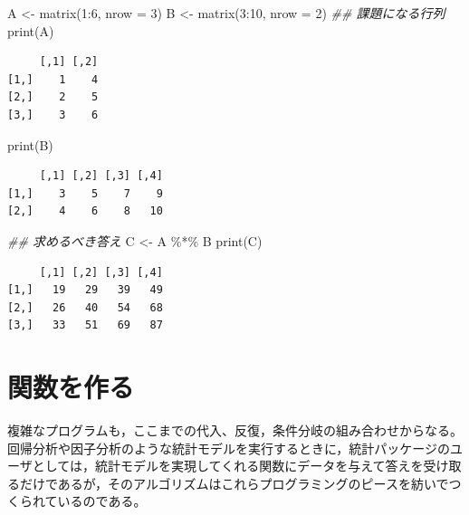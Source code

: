 \documentclass[
  a4paper,
]{ltjsbook}
\newenvironment{Shaded}{\begin{snugshade}}{\end{snugshade}}
\newcommand{\AttributeTok}[1]{\textcolor[rgb]{0.40,0.45,0.13}{#1}}
\newcommand{\DecValTok}[1]{\textcolor[rgb]{0.68,0.00,0.00}{#1}}
\newcommand{\DocumentationTok}[1]{\textcolor[rgb]{0.37,0.37,0.37}{\textit{#1}}}
\newcommand{\FunctionTok}[1]{\textcolor[rgb]{0.28,0.35,0.67}{#1}}
\newcommand{\NormalTok}[1]{\textcolor[rgb]{0.00,0.23,0.31}{#1}}
\newcommand{\OtherTok}[1]{\textcolor[rgb]{0.00,0.23,0.31}{#1}}
\newcommand{\SpecialCharTok}[1]{\textcolor[rgb]{0.37,0.37,0.37}{#1}}
\begin{document}
\begin{Shaded}
\begin{Highlighting}[]
\NormalTok{A }\OtherTok{\textless{}{-}} \FunctionTok{matrix}\NormalTok{(}\DecValTok{1}\SpecialCharTok{:}\DecValTok{6}\NormalTok{, }\AttributeTok{nrow =} \DecValTok{3}\NormalTok{)}
\NormalTok{B }\OtherTok{\textless{}{-}} \FunctionTok{matrix}\NormalTok{(}\DecValTok{3}\SpecialCharTok{:}\DecValTok{10}\NormalTok{, }\AttributeTok{nrow =} \DecValTok{2}\NormalTok{)}
\DocumentationTok{\#\# 課題になる行列}
\FunctionTok{print}\NormalTok{(A)}
\end{Highlighting}
\end{Shaded}

\begin{verbatim}
     [,1] [,2]
[1,]    1    4
[2,]    2    5
[3,]    3    6
\end{verbatim}

\begin{Shaded}
\begin{Highlighting}[]
\FunctionTok{print}\NormalTok{(B)}
\end{Highlighting}
\end{Shaded}

\begin{verbatim}
     [,1] [,2] [,3] [,4]
[1,]    3    5    7    9
[2,]    4    6    8   10
\end{verbatim}

\begin{Shaded}
\begin{Highlighting}[]
\DocumentationTok{\#\# 求めるべき答え}
\NormalTok{C }\OtherTok{\textless{}{-}}\NormalTok{ A }\SpecialCharTok{\%*\%}\NormalTok{ B}
\FunctionTok{print}\NormalTok{(C)}
\end{Highlighting}
\end{Shaded}

\begin{verbatim}
     [,1] [,2] [,3] [,4]
[1,]   19   29   39   49
[2,]   26   40   54   68
[3,]   33   51   69   87
\end{verbatim}

\section{関数を作る}\label{ux95a2ux6570ux3092ux4f5cux308b}

複雑なプログラムも，ここまでの代入、反復，条件分岐の組み合わせからなる。回帰分析や因子分析のような統計モデルを実行するときに，統計パッケージのユーザとしては，統計モデルを実現してくれる関数にデータを与えて答えを受け取るだけであるが，そのアルゴリズムはこれらプログラミングのピースを紡いでつくられているのである。
\end{document}
